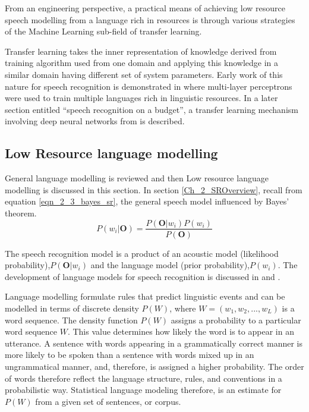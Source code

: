 From an engineering perspective, a practical means of achieving low resource speech modelling from a language rich in resources is through various strategies of the Machine Learning sub-field of transfer learning.  

Transfer learning takes the inner representation of knowledge derived from training algorithm used from one domain and applying this knowledge in a similar domain having different set of system parameters\citep{ramachandran2016unsupervised}. Early work of this nature for speech recognition is demonstrated in \citep{vu2013multilingual} where multi-layer perceptrons were used to train multiple languages rich in linguistic resources. In a later section entitled “speech recognition on a budget”, a transfer learning mechanism involving deep neural networks from \citep{kunze2017transfer} is described.

\subsection{Low Resource language modelling} \label{sec_lrlm}

General language modelling is reviewed and then Low resource language modelling is discussed in this section.  In section \ref{Ch_2_SROverview}, recall from equation \ref{eqn_2_3_bayes_sr}, the general speech model influenced by Bayes' theorem.
\begin{equation}P(w_i|\mathbf{O})=\frac{P(\mathbf{O}|w_i)P(w_i)}{P(\mathbf{O})}
\label{eqn_2_5_bayes_sr}
\end{equation}

The speech recognition model is a product of an acoustic model (likelihood probability),$P(\mathbf{O}|w_i)$ and the language model (prior probability),$P(w_i)$.  The development of  language models for speech recognition is discussed in \cite{juang2000automatic} and \cite{1996YoungA}.  

Language modelling formulate rules that predict linguistic events and can be modelled in terms of discrete density $P(W)$, where  $W=(w_1, w_2,..., w_L)$ is a word sequence. The density function $P(W)$ assigns a probability to a particular word sequence $W$.  This value determines how likely the word is to appear in an utterance. A sentence with words appearing in a grammatically correct manner is more likely to be spoken than a sentence with words mixed up in an ungrammatical manner, and, therefore, is assigned a higher probability. The order of words therefore reflect the language structure, rules, and conventions in a probabilistic way. Statistical language modeling therefore, is an estimate for $P(W)$ from a given set of sentences, or corpus.

